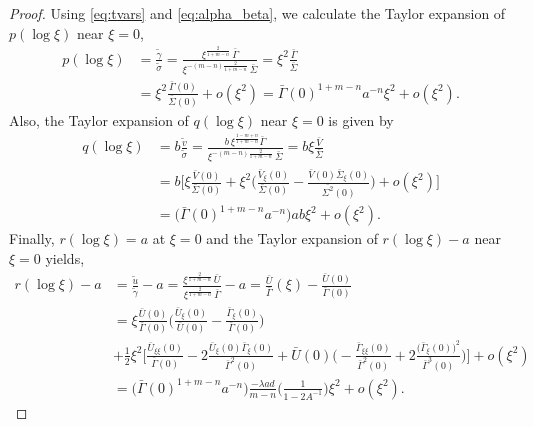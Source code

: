 \documentclass[a4paper,11pt]{article}
\def\bG{\bar{\Gamma}}
\numberwithin{step}{dummy}
\begin{document}
\begin{proof}
Using \eqref{eq:tvars} and \eqref{eq:alpha_beta}, we calculate the Taylor expansion of $p(\log\xi)$ near $\xi=0$, %
\begin{align*}
 {p}(\log\xi) &= 
  \frac{ \tilde \gamma}{ \tilde \sigma}  = 
   \frac{ \xi^{ \frac{2}{1 + m -n} } \, \bar\Gamma }{ \xi^{  - (m-n) \frac{2}{1 + m -n} } \, \bar\Sigma }   
  = \xi^2 \frac{ \bar\Gamma }{ \bar\Sigma }
  \\
 &= \xi^2 \frac{ \bar\Gamma(0) }{ \bar\Sigma(0) } + o(\xi^2) = \bG(0)^{1+m-n}a^{-n}\xi^2 + o(\xi^2). %
\end{align*}
{Also, the Taylor expansion of $q(\log\xi)$ near $\xi=0$ is given by}
\begin{align*}
 {q}(\log\xi) &= b\frac{ \tilde v}{ \tilde \sigma} 
 =      \frac{  b \,  \xi^{\frac{1-m+n}{1+m-n}} \bar\Gamma}{  \xi^{  - (m-n) \frac{2}{1 + m -n} } \, \bar\Sigma  }   
 = b\xi \frac{ \bar V }{ \bar\Sigma }
 \\
 &= b\bigg[\xi \frac{ \bar V(0) }{ \bar\Sigma(0) } + \xi^2  \bigg(\frac{\bar{ V }_\xi(0)}{\bar{ \Sigma }(0)} - \frac{ \bar V (0) \bar{ \Sigma }_\xi(0)}{\bar{ \Sigma^2 }(0)}\bigg) + o(\xi^2)\bigg]\\
 &=\big(\bG(0)^{1+m-n}a^{-n}\big)ab\xi^2 + o(\xi^2). 
\end{align*}
{Finally, $r(\log\xi)=a$ at $\xi=0$ and the Taylor expansion of $r(\log\xi)-a$ near \\$\xi=0$ yields, }
\begin{align*}
 {r}(\log\xi) -a &= \frac{ \tilde u}{ \tilde \gamma} - a
 =    \frac{ \xi^{ \frac{2}{1 + m -n} } \, \bar U }{ \xi^{ \frac{2}{1 + m -n} } \, \bar\Gamma } - a   
 = \frac{ \bar U }{ \bar\Gamma }(\xi) - \frac{ \bar{U}(0)}{ \bar{ \Gamma }(0)}\\
 &= \xi \frac{\bar{ U }(0)}{\bar{ \Gamma }(0)} \bigg(\frac{\bar{ U }_\xi(0)}{\bar{ U }(0)} - \frac{\bar{ \Gamma }_\xi(0)}{\bar{ \Gamma }(0)}\bigg) \\
 &+ \frac{1}{2}\xi^2\bigg[ \frac{\bar{U}_{\xi\xi}(0)}{ \bar{ \Gamma }(0)} - 2 \frac{ \bar{U}_\xi(0)\bar \Gamma_\xi(0)}{\bar \Gamma^2(0)} + \bar{U}(0) \bigg(- \frac{ \bar\Gamma_{\xi\xi}(0) }{\bar \Gamma^2(0)} + 2 \frac{\big(\bar \Gamma_\xi(0)\big)^2}{ \bar \Gamma^3(0) }\bigg) \bigg] + o(\xi^2)\\
 &=\big(\bG(0)^{1+m-n}a^{-n}\big)\frac{ -\lambda ad }{m-n}  \Bigg(\frac{1}{ 1 -  2  A^{-1}}\Bigg)   \xi^2 + o(\xi^2).

\end{align*}
\end{proof}
\end{document}
